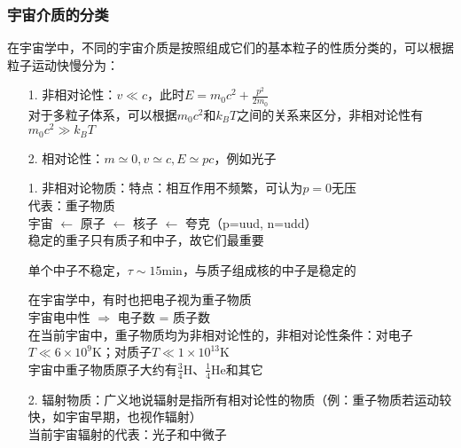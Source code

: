 \subsubsection{宇宙介质的分类}
\par 
在宇宙学中，不同的宇宙介质是按照组成它们的基本粒子的性质分类的，可以根据粒子运动快慢分为：
\begin{itemize}
	\item[1. ] 非相对论性：$v \ll c$，此时$E = m_0 c^2 + \frac{p^2}{2 m_0}$ \\
		对于多粒子体系，可以根据$m_0 c^2$和$k_B T$之间的关系来区分，非相对论性有$m_0 c^2 \gg k_B T$
	\item[2. ] 相对论性：$m \simeq 0, v \simeq c, E \simeq pc$，例如光子
\end{itemize}

\begin{itemize}
	\item[1. ] 非相对论物质：特点：相互作用不频繁，可认为$p=0$无压 \\
	代表：重子物质 \\
	宇宙 $\leftarrow$ 原子 $\leftarrow$ 核子 $\leftarrow$ 夸克（p=uud, n=udd） \\
	稳定的重子只有质子和中子，故它们最重要 
	\begin{cnote}
		单个中子不稳定，$\tau \sim 15 \mathrm{min}$，与质子组成核的中子是稳定的
	\end{cnote}
	在宇宙学中，有时也把电子视为重子物质 \\
	宇宙电中性 $\Rightarrow$	电子数 = 质子数 \\
	在当前宇宙中，重子物质均为非相对论性的，非相对论性条件：对电子$T \ll 6 \times 10^9 \mathrm{K}$；对质子$T \ll 1 \times 10^{13} \mathrm{K}$ \\
	宇宙中重子物质原子大约有$\frac{3}{4} \mathrm{H}$、$\frac{1}{4} \mathrm{He}$和其它
	
	\item[2. ] 辐射物质：广义地说辐射是指所有相对论性的物质（例：重子物质若运动较快，如宇宙早期，也视作辐射）\\ 
	当前宇宙辐射的代表：光子和中微子
\end{itemize}

